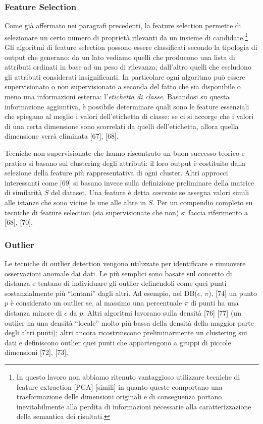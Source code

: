 \subsubsection{Feature Selection}
Come gi\`a affermato nei paragrafi precedenti, la feature selection permette di selezionare un certo numero di propriet\`a rilevanti da un insieme di candidate.\footnote{In questo lavoro non abbiamo ritenuto vantaggioso utilizzare tecniche di feature extraction [PCA] [simili] in quanto queste comportano una trasformazione delle dimensioni originali e di conseguenza portano inevitabilmente alla perdita di informazioni necessarie alla caratterizzazione della semantica dei risultati.}
Gli algoritmi di feature selection possono essere classificati secondo la tipologia di output che generano: da un lato vediamo quelli che producono una lista di attributi ordinati in base ad un peso di rilevanza; dall'altro quelli che escludono gli attributi considerati insignificanti. In particolare ogni algoritmo pu\`o essere supervisionato o non supervisionato a seconda del fatto che sia disponibile o meno una informazioni esterna: l'\textit{etichetta di classe}. Basandosi su questa informazione aggiuntiva, \`e possibile determinare quali sono le feature essenziali che spiegano al meglio i valori dell'etichetta di classe: se ci si accorge che i valori di una certa dimensione sono scorrelati da quelli dell'etichetta, allora quella dimensione verr\`a eliminata [67], [68].

Tecniche non supervisionate che hanno riscontrato un buon successo teorico e pratico si basano sul clustering degli attributi: il loro output \`e costituito dalla selezione della feature pi\`u rappresentativa di ogni cluster. Altri approcci interessanti come [69] si basano invece sulla definizione preliminare della matrice di similarit\`a $ S $ del dataset. Una feature \`e detta \textit{coerente} se assegna valori simili alle istanze che sono vicine le une alle altre in  $ S $.
Per un compendio completo su tecniche di feature selection (sia supervisionate che non) si faccia riferimento a [68], [70].

\subsubsection{Outlier}

Le tecniche di outlier detection vengono utilizzate per identificare e rimuovere osservazioni anomale dai dati.
Le pi\`u semplici sono basate sul concetto di distanza e tentano di individuare gli outlier definendoli come quei punti sostanzialmente pi\`u ``lontani'' dagli altri. Ad esempio, nel DB($\epsilon$, $\pi$), [74] un punto $ p $ \`e considerato un outlier se, al massimo una percentuale $ \pi $ di punti ha una distanza minore di $\epsilon $ da $ p $.
Altri algoritmi lavorano sulla densit\`a [76] [77] (un outlier ha una densit\`a ``locale'' molto pi\`u bassa della densit\`a della maggior parte degli altri punti); altri ancora ricostruiscono preliminarmente un clustering sui dati e definiscono outlier quei punti che appartengono a gruppi di piccole dimensioni [72], [73].

